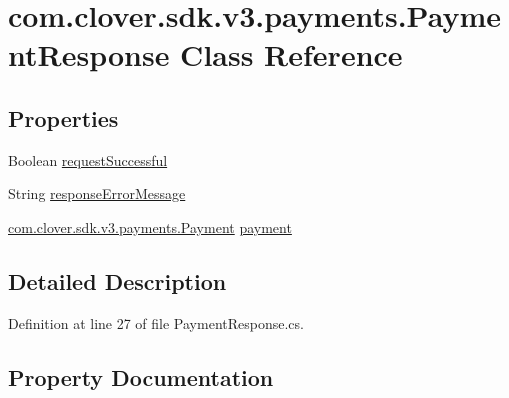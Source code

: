\hypertarget{classcom_1_1clover_1_1sdk_1_1v3_1_1payments_1_1_payment_response}{}\section{com.\+clover.\+sdk.\+v3.\+payments.\+Payment\+Response Class Reference}
\label{classcom_1_1clover_1_1sdk_1_1v3_1_1payments_1_1_payment_response}
\subsection*{Properties}
\begin{DoxyCompactItemize}
\item 
Boolean \hyperlink{classcom_1_1clover_1_1sdk_1_1v3_1_1payments_1_1_payment_response_a193f43a3b183e43a65c454507ce76620}{request\+Successful}
\item 
String \hyperlink{classcom_1_1clover_1_1sdk_1_1v3_1_1payments_1_1_payment_response_a0acd3c1ee0af687821b0686277282c36}{response\+Error\+Message}
\item 
\hyperlink{classcom_1_1clover_1_1sdk_1_1v3_1_1payments_1_1_payment}{com.\+clover.\+sdk.\+v3.\+payments.\+Payment} \hyperlink{classcom_1_1clover_1_1sdk_1_1v3_1_1payments_1_1_payment_response_a5587a13c66d658640a6acea45719558d}{payment}
\end{DoxyCompactItemize}


\subsection{Detailed Description}


Definition at line 27 of file Payment\+Response.\+cs.



\subsection{Property Documentation}
\mbox{\label{classcom_1_1clover_1_1sdk_1_1v3_1_1payments_1_1_payment_response_a5587a13c66d658640a6acea45719558d}} 
